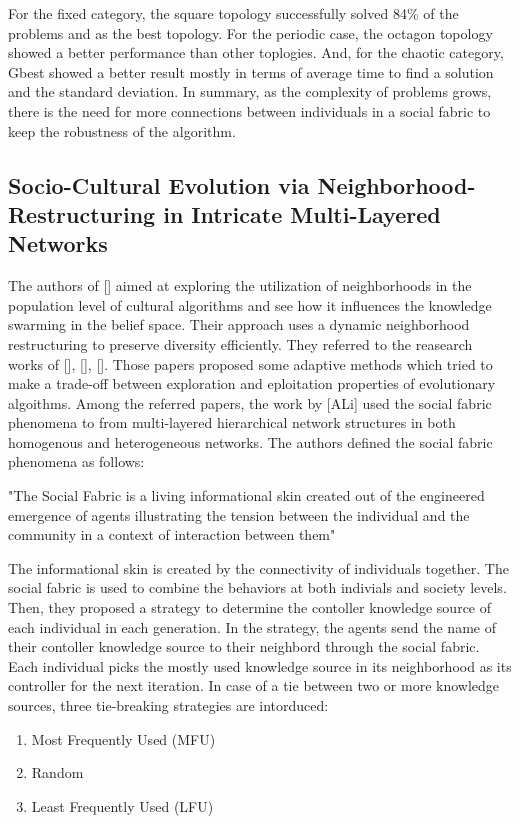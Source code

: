 For the fixed category, the square topology successfully solved 84\% of the problems and as the best topology. For the periodic case, the octagon topology showed a better performance than other toplogies. And, for the chaotic category, Gbest showed a better result mostly in terms of average time to find a solution and the standard deviation. In summary, as the complexity of problems grows, there is the need for more connections between individuals in a social fabric to keep the robustness of the algorithm.
\subsection{Socio-Cultural Evolution via Neighborhood-Restructuring in Intricate Multi-Layered Networks}
The authors of [] aimed at exploring the utilization of neighborhoods in the population level of cultural algorithms and see how it influences the knowledge swarming in the belief space. Their approach uses a dynamic neighborhood restructuring to preserve diversity efficiently. They referred to the reasearch works of [], [], []. Those papers proposed some adaptive methods which tried to make a trade-off between exploration and eploitation properties of evolutionary algoithms. Among the referred papers, the work by [ALi] used the social fabric phenomena to from multi-layered hierarchical network structures in both homogenous and heterogeneous networks.\newline
The authors defined the social fabric phenomena as follows:
\begin{displayquote}
	"The Social Fabric is a living informational skin created out of the engineered emergence of agents illustrating the tension between the individual and the community in a context of interaction between them"
\end{displayquote}
The informational skin is created by the connectivity of individuals together. The social fabric is used to combine the behaviors at both indivials and society levels. Then, they proposed a strategy to determine the contoller knowledge source of each individual in each generation. In the strategy, the agents send the name of their contoller knowledge source to their neighbord through the social fabric. Each individual picks the mostly used knowledge source in its neighborhood as its controller for the next iteration. In case of a tie between two or more knowledge sources, three tie-breaking strategies are intorduced:
\begin{enumerate}
	\item Most Frequently Used (MFU)
	\item Random
	\item Least Frequently Used (LFU)
\end{enumerate}

